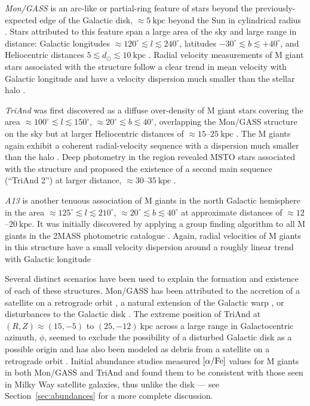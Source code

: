 \documentclass[galaxies,article,submit,moreauthors,pdftex,10pt,a4paper]{mdpi}
\newcommand{\kpc}{\mathrm{kpc}}
\begin{document}
\begin{description}
\item{\it Mon/GASS} is an arc-like or partial-ring feature of stars beyond the previously-expected edge of the Galactic disk, $\approx 5~\kpc$ beyond the Sun in cylindrical radius \cite{robin92}.
Stars attributed to this feature span a large area of the sky and large range
in distance: Galactic longitudes $\approx 120^\circ \lesssim l \lesssim
240^\circ$, latitudes $-30^\circ \lesssim b \lesssim +40^\circ$, and
Heliocentric distances $5\lesssim d_\odot \lesssim 10~\kpc$
\cite{Morganson:2016}.
Radial velocity measurements of M giant stars associated with the structure
follow a clear trend in mean velocity with Galactic longitude and have a
velocity dispersion much smaller than the stellar halo \cite{crane03}.
\item{\it TriAnd} was first discovered as a diffuse over-density of M giant
stars covering the area $\approx 100^\circ \lesssim l \lesssim 150^\circ$,
$\approx 20^\circ \lesssim b \lesssim 40^\circ$, overlapping the Mon/GASS
structure on the sky but at larger Heliocentric distances of $\approx
15$--$25~\kpc$ \cite{rochapinto04}.
The M giants again exhibit a coherent radial-velocity sequence with a
dispersion much smaller than the halo \cite{rochapinto04}.
Deep photometry in the region revealed MSTO stars associated with the structure
and proposed the existence of a second main sequence (``TriAnd 2'') at larger
distance, $\approx 30$--$35~\kpc$ \cite{martin07,martin14}.
\item{\it A13} is another tenuous association of M giants in the north Galactic
hemisphere in the area $\approx 125^\circ \lesssim l \lesssim 210^\circ$,
$\approx 20^\circ \lesssim b \lesssim 40^\circ$ at approximate distances of
$\approx 12$--$20~\kpc$.
It was initially discovered by applying a group finding algorithm
\cite{sharma09} to all M giants in the 2MASS photometric catalogue
\cite{sharma10}.
Again, radial velocities of M giants in this structure have a small velocity
dispersion around a roughly linear trend with Galactic longitude \cite{li17}
\end{description}

Several distinct scenarios have been used to explain the formation and
existence of each of these structures.
Mon/GASS has been attributed to the accretion of a satellite on a retrograde
orbit \cite{penarrubia05}, a natural extension of the Galactic warp
\cite{momany04,momany06}, or disturbances to the Galactic disk
\cite{kazantzidis08,younger08,purcell11,xu15,gomez16}.
The extreme position of TriAnd at $(R,Z) \approx (15, -5)$ to $(25,-12)~\kpc$
across a large range in Galactocentric azimuth, $\phi$, seemed to exclude the
possibility of a disturbed Galactic disk as a possible origin and has also been
modeled as debris from a satellite on a retrograde orbit \cite{sheffield14}.
Initial abundance studies measured $[\alpha/{\rm Fe}]$ values for M giants in
both Mon/GASS and TriAnd and found them to be consistent with those seen in
Milky Way satellite galaxies, thus unlike the disk \cite{chou2010b,chou11} ---
see Section~\ref{sec:abundances} for a more complete discussion.
\end{document}
